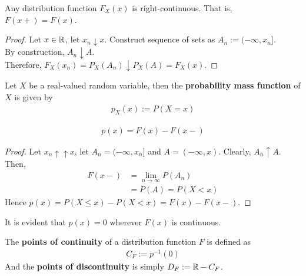 \documentclass{article}
\begin{document}
   	\begin{theorem}
   		Any distribution function $F_X(x)$ is right-continuous. That is, $F(x+) = F(x)$.
   	\end{theorem}
   	
   	\begin{proof}
   		Let $x \in \mathbb{R}$, let $x_n \downarrow x$. Construct sequence of sets as $A_n := (-\infty, x_n]$.\\
   		By construction, $A_n \downarrow A$. \\
   		Therefore, $F_X(x_n) = P_X(A_n) \downarrow P_X(A) = F_X(x)$.
   	\end{proof}
   	
   	\begin{definition}
   		Let $X$ be a real-valued random variable, then the \textbf{probability mass function} of $X$ is given by
   		\begin{align}
   			p_X(x) := P(X=x)
   		\end{align}
   	\end{definition}
   	
   	\begin{proposition}
   		\begin{align}
   			p(x) = F(x) - F(x-)
   		\end{align}
   	\end{proposition}
   	\begin{proof}
   		Let $x_n \uparrow\uparrow x$, let $A_n = (-\infty, x_n]$ and $A = (-\infty, x)$. Clearly, $A_n \uparrow A$. Then,
   		\begin{align}
   			F(x-) &= \lim_{n \to \infty} P(A_n) \\
   			&= P(A) = P(X < x)
   		\end{align}
   		Hence $p(x) = P(X \leq x) - P(X < x) = F(x) - F(x-)$.
   	\end{proof}
   	
   	\begin{proposition}
   		It is evident that $p(x) = 0$ wherever $F(x)$ is continuous.
   	\end{proposition}
   	
   	\begin{definition}
   		The \textbf{points of continuity} of a distribution function $F$ is defined as
   		\begin{align}
   			C_F := p^{-1}(0)
   		\end{align}
   		And the \textbf{points of discontinuity} is simply $D_F := \mathbb{R} - C_F$.
   	\end{definition}
   	
\end{document}
